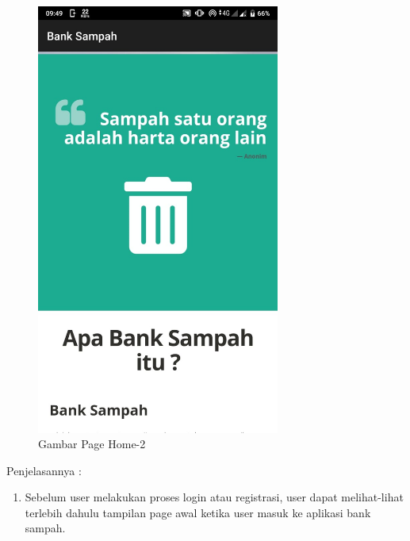 	\begin{figure}[H]
		\includegraphics[width=8cm]{figures/analisis/33.png}
		\centering
		\caption{Gambar Page Home-2}
	\end{figure}
Penjelasannya :
\begin{enumerate}
\item Sebelum user melakukan proses login atau registrasi, user dapat melihat-lihat terlebih dahulu tampilan page awal ketika user masuk ke aplikasi bank sampah.
\end{enumerate}

